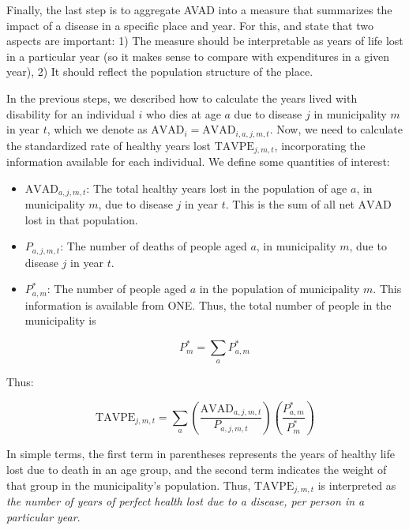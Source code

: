 \documentclass[11pt]{article}
\numberwithin{equation}{section}
\theoremstyle{remark}
\begin{document}
Finally, the last step is to aggregate AVAD into a measure that summarizes the impact of a disease in a specific place and year. For this, \citet{Marshall2010} and \citet{Claxton2015} state that two aspects are important: 1) The measure should be interpretable as years of life lost in a particular year (so it makes sense to compare with expenditures in a given year), 2) It should reflect the population structure of the place.

In the previous steps, we described how to calculate the years lived with disability for an individual $i$ who dies at age $a$ due to disease $j$ in municipality $m$ in year $t$, which we denote as $\text{AVAD}_{i}=\text{AVAD}_{i,a,j,m,t}$. Now, we need to calculate the standardized rate of healthy years lost $\text{TAVPE}_{j,m,t}$, incorporating the information available for each individual. We define some quantities of interest:

\begin{itemize}

    \item $\text{AVAD}_{a,j,m,t}$: The total healthy years lost in the population of age $a$, in municipality $m$, due to disease $j$ in year $t$. This is the sum of all net $\text{AVAD}$ lost in that population.
    
    \item $P_{a,j,m,t}$: The number of deaths of people aged $a$, in municipality $m$, due to disease $j$ in year $t$.

    \item $P^*_{a,m}$: The number of people aged $a$ in the population of municipality $m$. This information is available from ONE. Thus, the total number of people in the municipality is

    \[P_m^*= \sum \limits_{a} P^*_{a,m}\]

\end{itemize}

Thus:

\[\text{TAVPE}_{j,m,t}= \sum \limits_{a} \left( \dfrac{\text{AVAD}_{a,j,m,t}}{P_{a,j,m,t}} \right) \left( \dfrac{P^*_{a,m}}{P^*_m} \right)\]

In simple terms, the first term in parentheses represents the years of healthy life lost due to death in an age group, and the second term indicates the weight of that group in the municipality's population. Thus, $\text{TAVPE}_{j,m,t}$ is interpreted as \emph{the number of years of perfect health lost due to a disease, per person in a particular year}.
\end{document}
